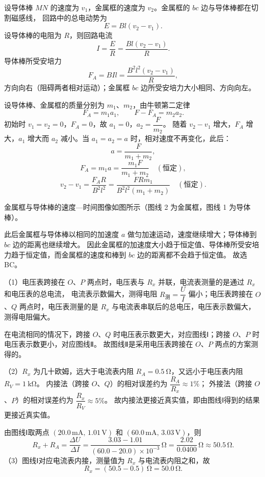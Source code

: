 \begin{answer}
设导体棒 $MN$ 的速度为 $v_1$，金属框的速度为 $v_2$。金属框的 $bc$ 边与导体棒都在切割磁感线，
回路中的总电动势为
\[
  E=Bl(v_2-v_1).
\]
设导体棒的电阻为 $R$，则回路电流
\[
  I=\frac{E}{R}=\frac{Bl(v_2-v_1)}{R}.
\]
导体棒所受安培力
\[
  F_A=BIl=\frac{B^{2}l^{2}(v_2-v_1)}{R},
\]
方向向右（阻碍两者相对运动）；金属框 $bc$ 边所受安培力大小相同、方向向左。

设导体棒、金属框的质量分别为 $m_1$、$m_2$，由牛顿第二定律
\[
  F_A=m_1a_1,\qquad F-F_A=m_2a_2.
\]
初始时 $v_1=v_2=0$，$F_A=0$，故 $a_1=0$，$a_2=\dfrac{F}{m_2}$。
随着 $v_2-v_1$ 增大，$F_A$ 增大，$a_1$ 增大而 $a_2$ 减小。当 $a_1=a_2=a$ 时，相对速度不再变化，此后：
\[
  a=\frac{F}{m_1+m_2},
\]
\[
  F_A=m_1a=\frac{m_1F}{m_1+m_2}\quad(\text{恒定}),
\]
\[
  v_2-v_1=\frac{F_A R}{B^{2}l^{2}}
          =\frac{FRm_1}{B^{2}l^{2}(m_1+m_2)}\quad(\text{恒定}).
\]
\begin{center}
  \small 金属框与导体棒的速度—时间图像如图所示（图线 2 为金属框，图线 1 为导体棒）。
\end{center}
此后金属框与导体棒以相同的加速度 $a$ 做匀加速运动，速度继续增大；导体棒到 $bc$ 边的距离也继续增大。
因此金属框的加速度大小趋于恒定值、导体棒所受安培力趋于恒定值，而金属框的速度和棒到 $bc$ 边的距离都不会趋于恒定值。
故选 BC。
\end{answer}

\begin{answer}
（1）电压表跨接在 $O$、$P$ 两点时，电压表与 $R_x$ 并联，电流表测量的是通过 $R_x$ 和电压表的总电流，
电流表示数偏大，测得电阻 $R_{\text{测}}=\dfrac{U}{I}$ 偏小；电压表跨接在 $O$、$Q$ 两点时，电压表测量的是
$R_x$ 与电流表串联后的总电压，电压表示数偏大，测得电阻偏大。

在电流相同的情况下，跨接 $O$、$Q$ 时电压表示数更大，对应图线Ⅰ；跨接 $O$、$P$ 时电压表示数更小，对应图线Ⅱ。
故图线Ⅱ是采用电压表跨接在 $O$、$P$ 两点的方案测得的。

（2）$R_x$ 为几十欧姆，远大于电流表内阻 $R_A=\SI{0.5}{\ohm}$，又远小于电压表内阻 $R_V=\SI{1}{\kilo\ohm}$。
内接法（跨接 $O$、$Q$）的相对误差约为 $\dfrac{R_A}{R_x}\approx1\%$；
外接法（跨接 $O$、$P$）的相对误差约为 $\dfrac{R_x}{R_V}\approx5\%$。
故内接法更接近真实值，即由图线Ⅰ得到的结果更接近真实值。

由图线Ⅰ取两点 $(20.0\,\mathrm{mA},\,1.01\,\mathrm{V})$ 和 $(60.0\,\mathrm{mA},\,3.03\,\mathrm{V})$，则
\[
  R_x+R_A=\frac{\Delta U}{\Delta I}
          =\frac{3.03-1.01}{(60.0-20.0)\times10^{-3}}\,\si{\ohm}
          =\frac{2.02}{0.0400}\,\si{\ohm}
          \approx50.5\,\si{\ohm}.
\]
（3）图线Ⅰ对应电流表内接，测量值为 $R_x$ 与电流表内阻之和，故
\[
  R_x=(50.5-0.5)\,\si{\ohm}=50.0\,\si{\ohm}.
\]
\end{answer}

